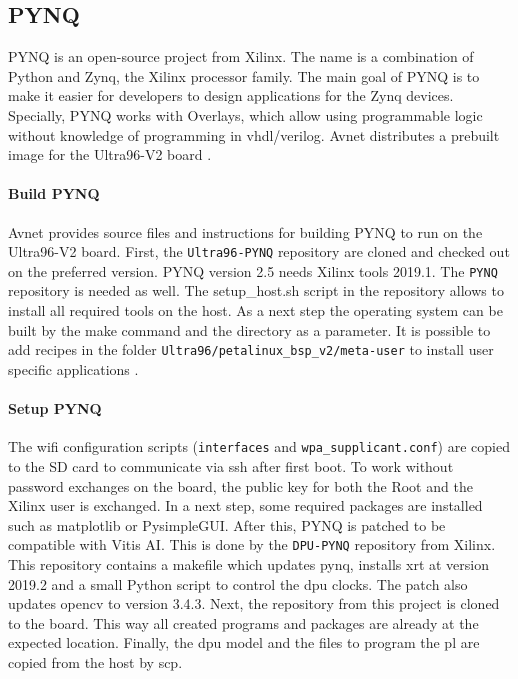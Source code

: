 \subsection{PYNQ}
\label{subsec:embedded_platform:operating_systems:pynq}

PYNQ is an open-source project from Xilinx.
The name is a combination of Python and Zynq, the Xilinx processor family.
The main goal of PYNQ is to make it easier for developers to design applications for the Zynq devices. 
Specially, PYNQ works with Overlays, which allow using programmable logic without knowledge of programming in vhdl/verilog.
Avnet distributes a prebuilt image for the Ultra96-V2 board \cite{pynq_intro}.

\paragraph{Build PYNQ}
Avnet provides source files and instructions for building PYNQ to run on the Ultra96-V2 board.
First, the \texttt{Ultra96-PYNQ} repository are cloned and checked out on the preferred version.
PYNQ version 2.5 needs Xilinx tools 2019.1.
The \texttt{PYNQ} repository is needed as well.
The setup\_host.sh script in the repository allows to install all required tools on the host.
As a next step the operating system can be built by the make command and the directory as a parameter.
It is possible to add recipes in the folder \texttt{Ultra96/petalinux\_bsp\_v2/meta-user} to install user specific applications \cite{avnet_pynq_github}. 

\paragraph{Setup PYNQ}
The wifi configuration scripts (\texttt{interfaces} and \texttt{wpa\_supplicant.conf}) are copied to the SD card to communicate via \acrfull{ssh} after first boot.
To work without password exchanges on the board, the public key for both the Root and the Xilinx user is exchanged.
In a next step, some required packages are installed such as matplotlib or PysimpleGUI.
After this, PYNQ is patched to be compatible with Vitis AI.
This is done by the \texttt{DPU-PYNQ} repository from Xilinx.
This repository contains a makefile which updates pynq, installs \acrfull{xrt} at version 2019.2 and a small Python script to control the \acrfull{dpu} clocks.
The patch also updates \acrshort{opencv} to version 3.4.3.
Next, the repository from this project is cloned to the board.
This way all created programs and packages are already at the expected location.
Finally, the \acrshort{dpu} model and the files to program the \acrfull{pl} are copied from the host by \acrfull{scp}.

